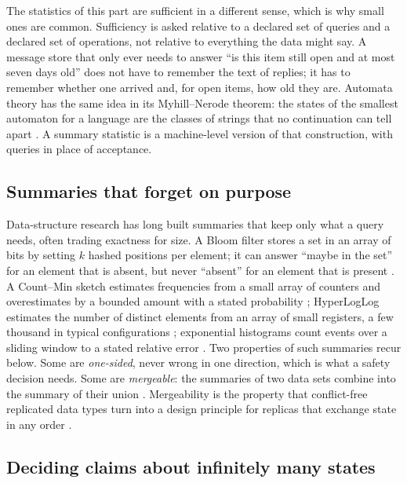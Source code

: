 \documentclass[11pt]{article}
\theoremstyle{definition}
\theoremstyle{plain}
\begin{document}
The statistics of this part are sufficient in a different sense, which is why small ones are
common. Sufficiency is asked relative to a declared set of queries and a declared set of
operations, not relative to everything the data might say. A message store that only ever needs to
answer ``is this item still open and at most seven days old'' does not have to remember the text of
replies; it has to remember whether one arrived and, for open items, how old they are. Automata
theory has the same idea in its Myhill--Nerode theorem: the states of the smallest automaton for a
language are the classes of strings that no continuation can tell apart \cite{nerode}. A summary
statistic is a machine-level version of that construction, with queries in place of acceptance.

\subsection{Summaries that forget on purpose}\label{sec:bg-sketch}

Data-structure research has long built summaries that keep only what a query needs, often trading
exactness for size. A Bloom filter stores a set in an array of bits by setting $k$ hashed positions
per element; it can answer ``maybe in the set'' for an element that is absent, but never ``absent''
for an element that is present \cite{bloom}. A Count--Min sketch estimates frequencies from a small
array of counters and overestimates by a bounded amount with a stated probability \cite{countmin};
HyperLogLog estimates the number of distinct elements from an array of small registers, a few
thousand in typical configurations \cite{hll}; exponential
histograms count events over a sliding window to a stated relative error \cite{datar}. Two
properties of such summaries recur below. Some are \emph{one-sided}, never wrong in one direction,
which is what a safety decision needs. Some are \emph{mergeable}: the summaries of two data sets
combine into the summary of their union \cite{mergeable}. Mergeability is the property that
conflict-free replicated data types turn into a design principle for replicas that exchange state
in any order \cite{crdt}.

\subsection{Deciding claims about infinitely many states}\label{sec:bg-smt}
\end{document}

